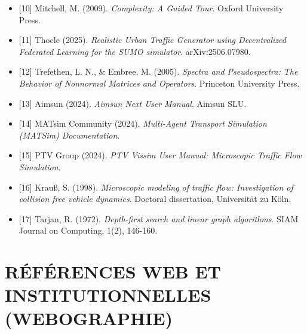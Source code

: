 \documentclass[10pt, a4paper]{article}
\begin{document}
\begin{itemize}
{  Differenzengleichungen, die partielle Differentialgleichungen
  approximieren}. BIT Numerical Mathematics, 2(3), 153-181.
\item
  {[}10{]} Mitchell, M. (2009). \emph{Complexity: A Guided Tour}. Oxford
  University Press.
\item
  {[}11{]} Thocle (2025). \emph{Realistic Urban Traffic Generator using
  Decentralized Federated Learning for the SUMO simulator}.
  arXiv:2506.07980.
\item
  {[}12{]} Trefethen, L. N., \& Embree, M. (2005). \emph{Spectra and
  Pseudospectra: The Behavior of Nonnormal Matrices and Operators}.
  Princeton University Press.
\item
  {[}13{]} Aimsun (2024). \emph{Aimsun Next User Manual}. Aimsun SLU.
\item
  {[}14{]} MATsim Community (2024). \emph{Multi-Agent Transport
  Simulation (MATSim) Documentation}.
\item
  {[}15{]} PTV Group (2024). \emph{PTV Vissim User Manual: Microscopic
  Traffic Flow Simulation}.
\item
  {[}16{]} Krauß, S. (1998). \emph{Microscopic modeling of traffic flow:
  Investigation of collision free vehicle dynamics}. Doctoral
  dissertation, Universität zu Köln.
\item
  {[}17{]} Tarjan, R. (1972). \emph{Depth-first search and linear graph
  algorithms}. SIAM Journal on Computing, 1(2), 146-160.
\end{itemize}

\newpage

\section{RÉFÉRENCES WEB ET INSTITUTIONNELLES
(WEBOGRAPHIE)}\label{ruxe9fuxe9rences-web-et-institutionnelles-webographie}
\end{document}
